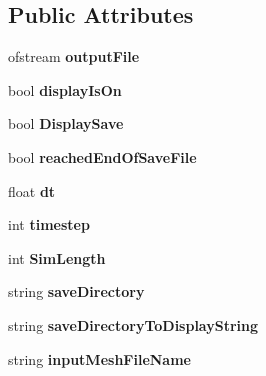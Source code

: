 \subsection*{Public Attributes}
\begin{DoxyCompactItemize}
\item 
\hypertarget{classSimulation_a9a1e6e912c3ecc2fe607e6ecea82a034}{}ofstream {\bfseries output\+File}\label{classSimulation_a9a1e6e912c3ecc2fe607e6ecea82a034}

\item 
\hypertarget{classSimulation_a219f980877f9cf37de32556b5bce836a}{}bool {\bfseries display\+Is\+On}\label{classSimulation_a219f980877f9cf37de32556b5bce836a}

\item 
\hypertarget{classSimulation_ab4d07267bab8e631658e2ef056ee5750}{}bool {\bfseries Display\+Save}\label{classSimulation_ab4d07267bab8e631658e2ef056ee5750}

\item 
\hypertarget{classSimulation_a99b66ca81fcc16dab7f44632ddff7ecd}{}bool {\bfseries reached\+End\+Of\+Save\+File}\label{classSimulation_a99b66ca81fcc16dab7f44632ddff7ecd}

\item 
\hypertarget{classSimulation_a0ee381efb3458d02bf78487cbb4dc42a}{}float {\bfseries dt}\label{classSimulation_a0ee381efb3458d02bf78487cbb4dc42a}

\item 
\hypertarget{classSimulation_a2056af9924aff237c804ffe006adc00b}{}int {\bfseries timestep}\label{classSimulation_a2056af9924aff237c804ffe006adc00b}

\item 
\hypertarget{classSimulation_ac8542a6861bdcad55e8c709956470ad5}{}int {\bfseries Sim\+Length}\label{classSimulation_ac8542a6861bdcad55e8c709956470ad5}

\item 
\hypertarget{classSimulation_a7f19976903a9463f37db5958f3b07fe2}{}string {\bfseries save\+Directory}\label{classSimulation_a7f19976903a9463f37db5958f3b07fe2}

\item 
\hypertarget{classSimulation_abdcb4d27d207276b9e594f15eeda8770}{}string {\bfseries save\+Directory\+To\+Display\+String}\label{classSimulation_abdcb4d27d207276b9e594f15eeda8770}

\item 
\hypertarget{classSimulation_adffbb38b93e49d3e04cb084f613f00be}{}string {\bfseries input\+Mesh\+File\+Name}\label{classSimulation_adffbb38b93e49d3e04cb084f613f00be}


\end{DoxyCompactItemize}
